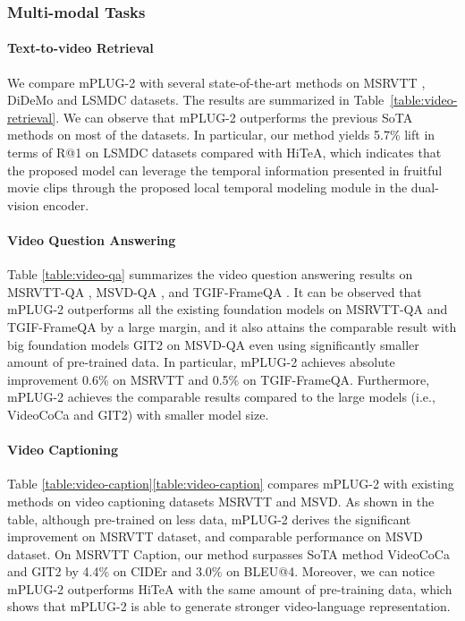 \documentclass{article}
\theoremstyle{plain}
\theoremstyle{definition}
\theoremstyle{remark}
\newcommand{\modelname}{mPLUG-2 }
\newcommand{\modelnamebase}{mPLUG-2 }
\begin{document}
\vspace{-2ex}
\subsubsection{Multi-modal Tasks}


\vspace{-1ex}
\paragraph{Text-to-video Retrieval}
We compare \modelname with several state-of-the-art methods on MSRVTT \citep{xu2016msrvtt}, DiDeMo \citep{anne2017didemo} and LSMDC \citep{rohrbach2015lsmdc} datasets. The results are summarized in Table~\ref{table:video-retrieval}. We can observe that \modelname outperforms the previous SoTA methods on most of the datasets. In particular, our method yields 5.7\% lift in terms of R@1 on LSMDC datasets compared with HiTeA, which indicates that the proposed model can leverage the temporal information presented in fruitful movie clips through the proposed local temporal modeling module in the dual-vision encoder.


\paragraph{Video Question Answering}
Table \ref{table:video-qa} summarizes the video question answering results on MSRVTT-QA \citep{xu2017msrvttqa}, MSVD-QA \citep{xu2017msrvttqa}, and TGIF-FrameQA \citep{jang2017tgif}. It can be observed that \modelname outperforms all the existing foundation models on MSRVTT-QA and TGIF-FrameQA by a large margin, and it also attains the comparable result with big foundation models GIT2 \citep{Wang2022GIT2} on MSVD-QA even using significantly smaller amount of pre-trained data. In particular, \modelname achieves absolute improvement 0.6\% on MSRVTT and 0.5\% on TGIF-FrameQA. Furthermore, \modelnamebase achieves the comparable results compared to the large models (i.e., VideoCoCa and GIT2) with smaller model size.

\paragraph{Video Captioning} 
Table \ref{table:video-caption}\ref{table:video-caption} compares \modelname with existing methods on video captioning datasets MSRVTT and MSVD. As shown in the table, although pre-trained on less data, \modelname derives the significant improvement on MSRVTT dataset, and comparable performance on MSVD dataset. On MSRVTT Caption, our method surpasses SoTA method VideoCoCa \citep{Yan2022VideoCoCa} and GIT2 \citep{Wang2022GIT2} by 4.4\% on CIDEr and 3.0\% on BLEU@4. Moreover, we can notice \modelname outperforms HiTeA with the same amount of pre-training data, which shows that \modelname is able to generate stronger video-language representation.
\end{document}
